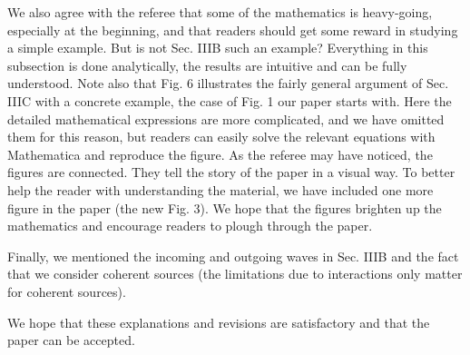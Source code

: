 We also agree with the referee that some of the mathematics is heavy-going, especially at the beginning, and that readers should get some reward in studying a simple example. But is not Sec. IIIB such an example? Everything in this subsection is done analytically, the results are intuitive and can be fully understood. Note also that Fig. 6 illustrates the fairly general argument of Sec. IIIC with a concrete example, the case of Fig. 1 our paper starts with. Here the detailed mathematical expressions are more complicated, and we have omitted them for this reason, but readers can easily solve the relevant equations with Mathematica and reproduce the figure. As the referee may have noticed, the figures are connected. They tell the story of the paper in a visual way. To better help the reader with understanding the material, we have included one more figure in the paper (the new Fig. 3). We hope that the figures brighten up the mathematics and encourage readers to plough through the paper.

Finally, we mentioned the incoming and outgoing waves in Sec. IIIB and the fact that we consider coherent sources (the limitations due to interactions only matter for coherent sources).

We hope that these explanations and revisions are satisfactory and that the paper can be accepted. 
